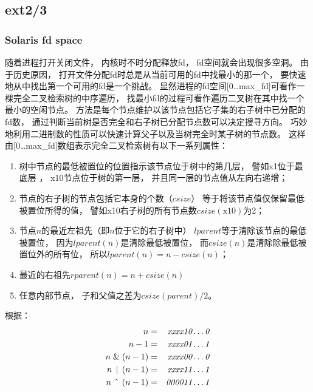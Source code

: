 \subsection{ext2/3}







\subsubsection{Solaris fd space}
随着进程打开关闭文件，
内核时不时分配释放fd，
fd空间就会出现很多空洞。
由于历史原因，
打开文件分配fd时总是从当前可用的fd中找最小的那一个，
要快速地从中找出第一个可用的fd是一个挑战。
显然进程的fd空间[0\dots {\sc max\_fd}]可看作一棵完全二叉检索树的中序遍历，
找最小fd的过程可看作遍历二叉树在其中找一个最小的空闲节点。
方法是每个节点维护以该节点包括它子集的右子树中已分配的fd数，
通过判断当前树是否完全和右子树已分配节点数可以决定搜寻方向。
巧妙地利用二进制数的性质可以快速计算父子以及当树完全时某子树的节点数。
这样由[0\dots {\sc max\_fd}]数组表示完全二叉检索树有以下一系列属性：

\begin{enumerate}
\item 树中节点的最低被置位的位置指示该节点位于树中的第几层，
  譬如x1位于最底层 ，
  x10节点位于树的第一层，
  并且同一层的节点值从左向右递增；

\item 节点的右子树的节点包括它本身的个数（$csize$）
  等于将该节点值仅保留最低被置位所得的值，
  譬如x10右子树的所有节点数$csize(\text{x10})$为2；

\item 节点$n$的最近左祖先（即$n$位于它的右子树中）
  $lparent$等于清除该节点的最低被置位，
  因为$lparent(n)$是清除最低被置位，
  而$csize(n)$是清除除最低被置位外的所有位，
  所以$lparent(n) = n - csize(n)$；

\item 最近的右祖先$rparent(n) = n + csize(n)$

\item 任意内部节点，
  子和父值之差为$csize(parent) / 2$。
\end{enumerate}

根据：
\begin{eqnarray}
  n &=& \textit{xxxx10}\dots{\it 0}\\
  n - 1 &=& \textit{xxxx01}\dots{\it 1}\\
  n \;\&\; (n - 1) &=& \textit{xxxx00}\dots{\it 0}\\
  n \,\mid\, (n - 1) &=& \textit{xxxx11}\dots{\it 1}\\
  n \,\XOR\, (n - 1) &=& \textit{000011}\dots{\it 1}
\end{eqnarray}

